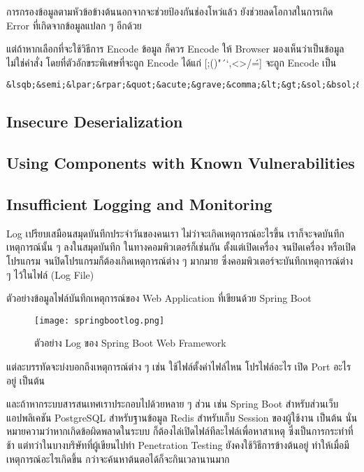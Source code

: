 การกรองข้อมูลตามหัวข้อข้างต้นนอกจากจะช่วยป้องกันช่องโหว่แล้ว ยังช่วยลดโอกาสในการเกิด Error ที่เกิดจากข้อมูลแปลก ๆ อีกด้วย

แต่ถ้าหากเลือกที่จะใช้วิธีการ Encode ข้อมูล ก็ควร Encode ให้ Browser มองเห็นว่าเป็นข้อมูลไม่ใช่คำสั่ง โดยที่ตัวอักขระพิเศษที่จะถูก Encode ได้แก่ [;()"´`,<>/\'=] จะถูก Encode เป็น

 \begin{lstlisting}[numbers=none]
&lsqb;&semi;&lpar;&rpar;&quot;&acute;&grave;&comma;&lt;&gt;&sol;&bsol;&apos;&equals;&rsqb;
\end{lstlisting}

\subsection{Insecure Deserialization}

\subsection{Using Components with Known Vulnerabilities}

\subsection{Insufficient Logging and Monitoring}

Log เปรียบเสมือนสมุดบันทึกประจำวันของคนเรา ไม่ว่าจะเกิดเหตุการณ์อะไรขึ้น เราก็จะจดบันทึกเหตุการณ์นั้น ๆ ลงในสมุดบันทึก ในทางคอมพิวเตอร์ก็เช่นกัน ตั้งแต่เปิดเครื่อง จนปิดเครื่อง หรือเปิดโปรแกรม จนปิดโปรแกรมก็ต้องเกิดเหตุการณ์ต่าง ๆ มากมาย ซึ่งคอมพิวเตอร์จะบันทึกเหตุการณ์ต่าง ๆ ไว้ในไฟล์ (Log File)

ตัวอย่างข้อมูลไฟล์บันทึกเหตุการณ์ของ Web Application ที่เขียนด้วย Spring Boot

\begin{figure}[h]
	\centering
	\texttt{[image: springbootlog.png]}
	\caption{ตัวอย่าง Log ของ Spring Boot Web Framework}
	\label{Fig:springbootlog.png}
\end{figure}

แต่ละบรรทัดจะบ่งบอกถึงเหตุการณ์ต่าง ๆ เช่น ใช้ไฟล์ตั้งค่าไฟล์ไหน โปรไฟล์อะไร เปิด Port อะไรอยู่ เป็นต้น

และถ้าหากระบบสารสนเทศเราประกอบไปด้วยหลาย ๆ ส่วน เช่น Spring Boot สำหรับส่วนเว็บแอปพลิเคชัน PostgreSQL สำหรับฐานข้อมูล Redis สำหรับเก็บ Session ของผู้ใช้งาน เป็นต้น นั่นหมายความว่าหากเกิดข้อผิดพลาดในระบบ ก็ต้องไล่เปิดไฟล์ทีละไฟล์เพื่อหาสาเหตุ ซึ่งเป็นการกระทำที่ช้า แต่ทว่าในบางบริษัทที่ผู้เขียนไปทำ Penetration Testing ยังคงใช้วิธีการข้างต้นอยู่ ทำให้เมื่อมีเหตุการณ์อะไรเกิดขึ้น กว่าจะค้นหาต้นตอได้ก็จะกินเวลานานมาก

